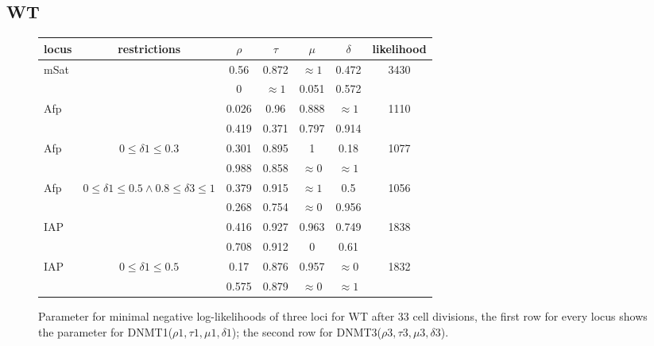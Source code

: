 \subsection{WT}
\label{WT}
\begin{figure}[h]
\begin{center}
\begin{tabularx}{\textwidth}{l|c|c|c|c|c|c}
locus&	restrictions&	$\rho$&	$\tau$&	$\mu$&	$\delta$&	likelihood\\
\hline
mSat&	&	0.56&	0.872&	$\approx1$&	0.472&	3430\\
	&	&	0&	$\approx1$&	0.051&	0.572&	\\
\hline
Afp&	&	0.026&	0.96&	0.888&	$\approx1$&	1110\\
	&	&	0.419&	0.371&	0.797&	0.914&	\\
\hline
Afp&	$0 \leq \delta1 \leq 0.3$&	0.301&	0.895&	1&	0.18&	1077\\%
	&	&	0.988&	0.858&	$\approx0$&	$\approx1$&	\\
\hline
Afp&	$0 \leq \delta1 \leq 0.5 \wedge 0.8 \leq \delta3 \leq 1$&	0.379&	0.915&	$\approx1$&	0.5&	1056\\
	&	&	0.268&	0.754&	$\approx0$&	0.956&	\\
\hline
IAP&	&	0.416&	0.927&	0.963&	0.749&	1838\\%
	&	&	0.708&	0.912&	0&	0.61&	\\
\hline
IAP&	$0 \leq \delta1 \leq 0.5$&	0.17&	0.876&	0.957&	$\approx0$&	1832\\%
	&	&	0.575&	0.879&	$\approx0$&	$\approx1$&	\\
\end{tabularx}
\end{center}
\label{WT33}
\caption{Parameter for minimal negative log-likelihoods of three loci for WT after 33 cell divisions, the first row for every locus shows the parameter for DNMT1($\rho1, \tau1, \mu1, \delta1$); the second row for DNMT3($\rho3, \tau3, \mu3, \delta3$).}
\end{figure}

